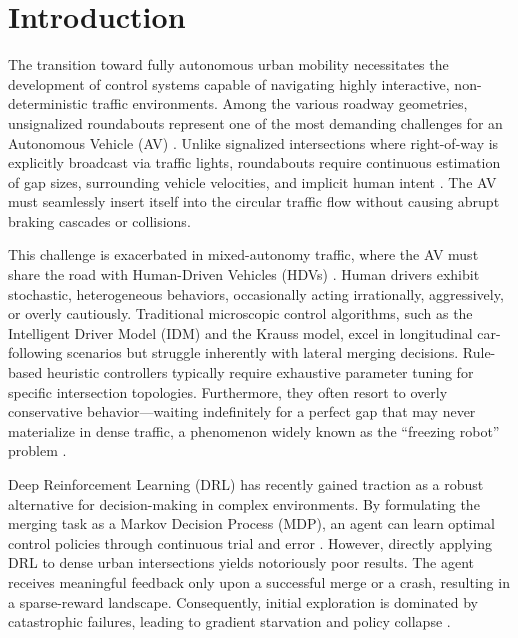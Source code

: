 \documentclass[conference]{IEEEtran}
\begin{document}
\section{Introduction}
The transition toward fully autonomous urban mobility necessitates the development of control systems capable of navigating highly interactive, non-deterministic traffic environments. Among the various roadway geometries, unsignalized roundabouts represent one of the most demanding challenges for an Autonomous Vehicle (AV) \cite{kiran2021deep}. Unlike signalized intersections where right-of-way is explicitly broadcast via traffic lights, roundabouts require continuous estimation of gap sizes, surrounding vehicle velocities, and implicit human intent \cite{troutbeck1999limited}. The AV must seamlessly insert itself into the circular traffic flow without causing abrupt braking cascades or collisions. 

This challenge is exacerbated in mixed-autonomy traffic, where the AV must share the road with Human-Driven Vehicles (HDVs) \cite{wu2021flow}. Human drivers exhibit stochastic, heterogeneous behaviors, occasionally acting irrationally, aggressively, or overly cautiously. Traditional microscopic control algorithms, such as the Intelligent Driver Model (IDM) \cite{treiber2000congested} and the Krauss model, excel in longitudinal car-following scenarios but struggle inherently with lateral merging decisions. Rule-based heuristic controllers typically require exhaustive parameter tuning for specific intersection topologies. Furthermore, they often resort to overly conservative behavior—waiting indefinitely for a perfect gap that may never materialize in dense traffic, a phenomenon widely known as the ``freezing robot'' problem \cite{aradi2020survey}.

Deep Reinforcement Learning (DRL) has recently gained traction as a robust alternative for decision-making in complex environments. By formulating the merging task as a Markov Decision Process (MDP), an agent can learn optimal control policies through continuous trial and error \cite{mnih2015human, silver2016mastering}. However, directly applying DRL to dense urban intersections yields notoriously poor results. The agent receives meaningful feedback only upon a successful merge or a crash, resulting in a sparse-reward landscape. Consequently, initial exploration is dominated by catastrophic failures, leading to gradient starvation and policy collapse \cite{isele2018navigating}.
\end{document}
